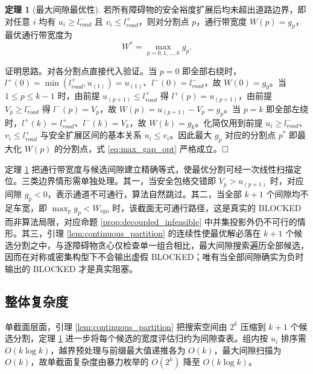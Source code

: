 \documentclass[a4paper,11pt]{ctexart}
\theoremstyle{definition}
\newtheorem{theorem}{定理}[section]
\begin{document}
\begin{theorem}[最大间隙最优性]
\label{thm:max_gap}
若所有障碍物的安全裕度扩展后均未超出道路边界，即对任意 $i$ 均有 $u_i \geq l_{road}^{-}$ 且 $v_i \leq l_{road}^{+}$，则对分割点 $p$，通行带宽度 $W(p) = g_p$，最优通行带宽度为
\begin{equation}
    W^{*} = \max_{p = 0, 1, \ldots, k} g_p.
    \label{eq:max_gap_opt}
\end{equation}
\end{theorem}

证明思路。对各分割点直接代入验证。当 $p = 0$ 即全部右绕时，$l^{+}(0) = \min(l_{road}^{+}, u_{(1)}) = u_{(1)}$、$l^{-}(0) = l_{road}^{-}$，故 $W(0) = g_0$。当 $1 \leq p \leq k-1$ 时，由前提 $u_{(p+1)} \leq l_{road}^{+}$ 得 $l^{+}(p) = u_{(p+1)}$，由前提 $V_p \geq l_{road}^{-}$ 得 $l^{-}(p) = V_p$，故 $W(p) = u_{(p+1)} - V_p = g_p$。当 $p = k$ 即全部左绕时，$l^{+}(k) = l_{road}^{+}$、$l^{-}(k) = V_k$，故 $W(k) = g_k$。化简仅用到前提 $u_i \geq l_{road}^{-}$、$v_i \leq l_{road}^{+}$ 与安全扩展区间的基本关系 $u_i \leq v_i$。因此最大 $g_p$ 对应的分割点 $p^{*}$ 即最大化 $W(p)$ 的分割点，式 \eqref{eq:max_gap_opt} 严格成立。$\hfill\Box$

定理 \ref{thm:max_gap} 把通行带宽度与候选间隙建立精确等式，使最优分割可经一次线性扫描定位。三类边界情形需单独处理。其一，当安全包络交错即 $V_p > u_{(p+1)}$ 时，对应间隙 $g_p < 0$，表示通道不可通行，算法自然跳过。其二，当全部 $k+1$ 个间隙均不足车宽，即 $\max_p g_p < W_{\text{ego}}$ 时，该截面无可通行路径，这是真实的 BLOCKED 而非算法局限，对应命题 \ref{prop:decoupled_infeasible} 中并集投影外仍不可行的情形。其三，引理 \ref{lem:continuous_partition} 的连续性使最优解必落在 $k+1$ 个候选分割之中，与逐障碍物贪心仅检查单一组合相比，最大间隙搜索遍历全部候选，因而在对称或密集构型下不会输出虚假 BLOCKED；唯有当全部间隙确实为负时输出的 BLOCKED 才是真实阻塞。

\subsection{整体复杂度}
\label{sec:thy_complexity}

单截面层面，引理 \ref{lem:continuous_partition} 把搜索空间由 $2^k$ 压缩到 $k+1$ 个候选分割，定理 \ref{thm:max_gap} 进一步将每个候选的宽度评估归约为间隙查表。组内按 $u_i$ 排序需 $O(k \log k)$，越界预处理与前缀最大值递推各为 $O(k)$，最大间隙扫描为 $O(k)$，故单截面复杂度由暴力枚举的 $O(2^k)$ 降至 $O(k \log k)$。
\end{document}
